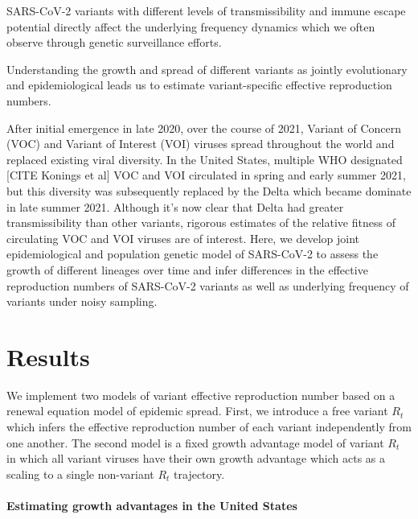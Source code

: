 \documentclass[12pt]{article}
\begin{document}
SARS-CoV-2 variants with different levels of transmissibility and immune escape potential directly affect the underlying frequency dynamics which we often observe through genetic surveillance efforts.

Understanding the growth and spread of different variants as jointly evolutionary and epidemiological leads us to estimate variant-specific effective reproduction numbers.


After initial emergence in late 2020, over the course of 2021, Variant of Concern (VOC) and Variant of Interest (VOI) viruses spread throughout the world and replaced existing viral diversity.
In the United States, multiple WHO designated [CITE Konings et al] VOC and VOI circulated in spring and early summer 2021, but this diversity was subsequently replaced by the Delta which became dominate in late summer 2021.
Although it's now clear that Delta had greater transmissibility than other variants, rigorous estimates of the relative fitness of circulating VOC and VOI viruses are of interest.
Here, we develop joint epidemiological and population genetic model of SARS-CoV-2 to assess the growth of different lineages over time and infer differences in the effective reproduction numbers of SARS-CoV-2 variants as well as underlying frequency of variants under noisy sampling.

\section{Results}


We implement two models of variant effective reproduction number based on a renewal equation model of epidemic spread.
First, we introduce a free variant $R_{t}$ which infers the effective reproduction number of each variant independently from one another.
The second model is a fixed growth advantage model of variant $R_{t}$ in which all variant viruses have their own growth advantage which acts as a scaling to a single non-variant $R_{t}$ trajectory.


\paragraph{Estimating growth advantages in the United States}
\end{document}
